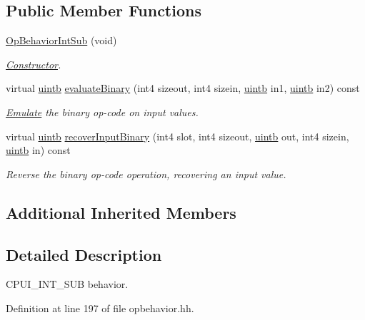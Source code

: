 \subsection*{Public Member Functions}
\begin{DoxyCompactItemize}
\item 
\mbox{\hyperlink{class_op_behavior_int_sub_a81e9a0003e06cd85756e6b40f625ec94}{Op\+Behavior\+Int\+Sub}} (void)
\begin{DoxyCompactList}\small\item\em \mbox{\hyperlink{class_constructor}{Constructor}}. \end{DoxyCompactList}\item 
virtual \mbox{\hyperlink{types_8h_a2db313c5d32a12b01d26ac9b3bca178f}{uintb}} \mbox{\hyperlink{class_op_behavior_int_sub_a9bd6743b831027c8210b082d197d7baf}{evaluate\+Binary}} (int4 sizeout, int4 sizein, \mbox{\hyperlink{types_8h_a2db313c5d32a12b01d26ac9b3bca178f}{uintb}} in1, \mbox{\hyperlink{types_8h_a2db313c5d32a12b01d26ac9b3bca178f}{uintb}} in2) const
\begin{DoxyCompactList}\small\item\em \mbox{\hyperlink{class_emulate}{Emulate}} the binary op-\/code on input values. \end{DoxyCompactList}\item 
virtual \mbox{\hyperlink{types_8h_a2db313c5d32a12b01d26ac9b3bca178f}{uintb}} \mbox{\hyperlink{class_op_behavior_int_sub_a1647fd9949497b49b5c152ae36710b3a}{recover\+Input\+Binary}} (int4 slot, int4 sizeout, \mbox{\hyperlink{types_8h_a2db313c5d32a12b01d26ac9b3bca178f}{uintb}} out, int4 sizein, \mbox{\hyperlink{types_8h_a2db313c5d32a12b01d26ac9b3bca178f}{uintb}} in) const
\begin{DoxyCompactList}\small\item\em Reverse the binary op-\/code operation, recovering an input value. \end{DoxyCompactList}\end{DoxyCompactItemize}
\subsection*{Additional Inherited Members}


\subsection{Detailed Description}
C\+P\+U\+I\+\_\+\+I\+N\+T\+\_\+\+S\+UB behavior. 

Definition at line 197 of file opbehavior.\+hh.



